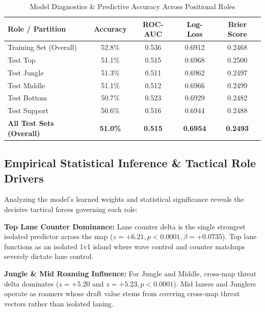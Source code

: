 \documentclass[11pt,letterpaper]{article}
\begin{document}
\vspace{-0.5em}
\begin{table}[H]
\centering
\caption{Model Diagnostics \& Predictive Accuracy Across Positional Roles}
\label{tab:model_perf}
\footnotesize
\setlength{\tabcolsep}{10pt}
\begin{tabular}{lcccc}
\toprule
\textbf{Role / Partition} & \textbf{Accuracy} & \textbf{ROC-AUC} & \textbf{Log-Loss} & \textbf{Brier Score} \\
\midrule
Training Set (Overall) & 52.8\% & 0.536 & 0.6912 & 0.2468 \\
Test Top & 51.1\% & 0.515 & 0.6968 & 0.2500 \\
Test Jungle & 51.3\% & 0.511 & 0.6962 & 0.2497 \\
Test Middle & 51.1\% & 0.512 & 0.6966 & 0.2499 \\
Test Bottom & 50.7\% & 0.523 & 0.6929 & 0.2482 \\
Test Support & 50.6\% & 0.516 & 0.6944 & 0.2488 \\
\midrule
\textbf{All Test Sets (Overall)} & \textbf{51.0\%} & \textbf{0.515} & \textbf{0.6954} & \textbf{0.2493} \\
\bottomrule
\end{tabular}
\end{table}
\vspace{-0.7em}

\subsection{Empirical Statistical Inference \& Tactical Role Drivers}

Analyzing the model's learned weights and statistical significance reveals the decisive tactical forces governing each role:
\vspace{0.25em}

\noindent \textbf{Top Lane Counter Dominance:} Lane counter delta is the single strongest isolated predictor across the map ($z = +6.21, p < 0.0001, \beta = +0.0735$). Top lane functions as an isolated 1v1 island where wave control and counter matchups severely dictate lane control.

\vspace{0.2em}
\noindent \textbf{Jungle \& Mid Roaming Influence:} For Jungle and Middle, cross-map threat delta dominates ($z = +5.20$ and $z = +5.23, p < 0.0001$). Mid laners and Junglers operate as roamers whose draft value stems from covering cross-map threat vectors rather than isolated laning.
\end{document}
